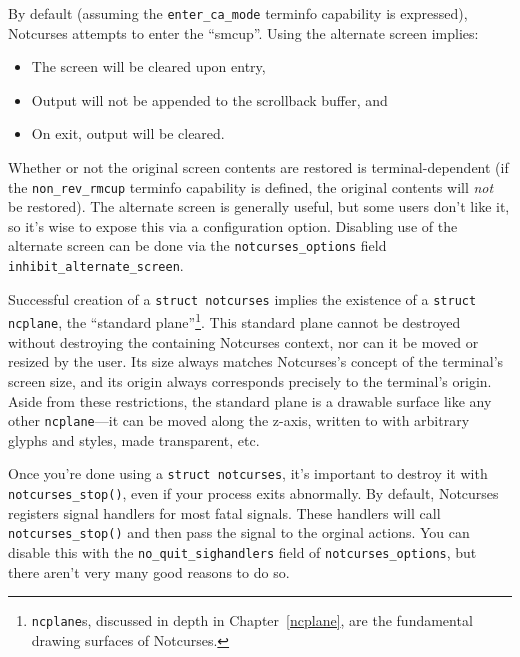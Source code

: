 \documentclass[letterpaper,10pt]{article}
\newenvironment{denseitemize}{
  \begin{itemize}
      \setlength{\itemsep}{0pt}
}{
  \end{itemize}
}
\begin{document}
By default (assuming the \texttt{enter\_ca\_mode} terminfo capability is expressed),
Notcurses attempts to enter the ``\gls{smcup}''. Using the alternate screen
implies:
\begin{denseitemize}
\item{The screen will be cleared upon entry,}
\item{Output will not be appended to the scrollback buffer, and}
\item{On exit, output will be cleared.}
\end{denseitemize}
Whether or not the original screen contents are restored is terminal-dependent
(if the \texttt{non\_rev\_rmcup} terminfo capability is defined, the original
contents will \textit{not} be restored). The alternate screen is generally
useful, but some users don't like it, so it's wise to expose this via a
configuration option. Disabling use of the alternate screen can be done via the
\texttt{notcurses\_options} field \texttt{inhibit\_alternate\_screen}.

Successful creation of a \texttt{struct notcurses} implies the existence of
a \texttt{struct ncplane}, the ``standard plane''\footnote{\texttt{ncplane}s,
discussed in depth in Chapter~\ref{ncplane}, are the fundamental drawing surfaces of Notcurses.}.
This standard plane cannot be destroyed without destroying the containing
Notcurses context, nor can it be moved or resized by the user. Its size always
matches Notcurses's concept of the terminal's screen size, and its origin
always corresponds precisely to the terminal's origin. Aside from these
restrictions, the standard plane is a drawable surface like any other
\texttt{ncplane}---it can be moved along the z-axis, written to with arbitrary
glyphs and styles, made transparent, etc.

Once you're done using a \texttt{struct notcurses}, it's important to destroy
it with \texttt{notcurses\_stop()}, even if your process exits abnormally. By
default, Notcurses registers signal handlers for most fatal signals. These
handlers will call \texttt{notcurses\_stop()} and then pass the signal to the
orginal actions. You can disable this with the \texttt{no\_quit\_sighandlers}
field of \texttt{notcurses\_options}, but there aren't very many good reasons
to do so.
\end{document}
